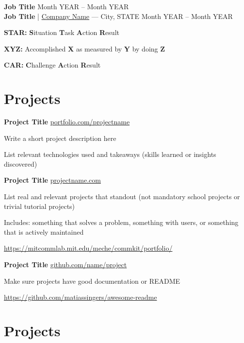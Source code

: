 \documentclass[letterpaper,11pt]{article}
\newcommand*{\Job}[6]{
  \ifthenelse{\isempty{#3}} 
  {\textbf{#2} \hfill {\small #1} \\}
  {\textbf{#2} | \href{#5}{#3} --- {\small #4} \hfill {\small #1} \\}
  \vspace{-9pt}
  \begin{itemize}
    {#6}
  \end{itemize}
}
\newcommand*{\Project}[4]{
  \textbf{#1} \hfill \href{#3}{\small #2} \\
  \vspace{-9pt}
  \begin{itemize}
    {#4}
  \end{itemize}
}
\begin{document}
\Job
  {Month YEAR -- Month YEAR}
  {Job Title}
  {Company Name}
  {City, STATE}
  {https://company-website.com}
  {
    \item \textbf{STAR:} \textbf{S}ituation \textbf{T}ask \textbf{A}ction \textbf{R}esult
    \item \textbf{XYZ:} Accomplished \textbf{X} as measured by \textbf{Y} by doing \textbf{Z}
    \item \textbf{CAR:} \textbf{C}hallenge \textbf{A}ction \textbf{R}esult
  }

\vspace{-18.5pt}


\section*{Projects}
 
\Project 
  {Project Title}                   %
  {portfolio.com/projectname}       %
  {https://kennyzqng.com}           %
  {                                 %
    \item Write a short project description here
    \item List relevant technologies used and takeaways 
      (skills learned or insights discovered)
  } 

\Project 
  {Project Title}
  {projectname.com}
  {https://mitcommlab.mit.edu/meche/commkit/portfolio/}
  {
    \item List real and relevant projects that standout
      (not mandatory school projects or trivial tutorial projects)
    \item Includes: something that solves a problem, something with users,
      or something that is actively maintained
    \item \url{https://mitcommlab.mit.edu/meche/commkit/portfolio/}
  }

\Project 
  {Project Title}
  {github.com/name/project}
  {https://github.com/matiassingers/awesome-readme}
  {
    \item Make sure projects have good documentation or README
    \item \url{https://github.com/matiassingers/awesome-readme}
  }

\section*{Projects}
\end{document}
